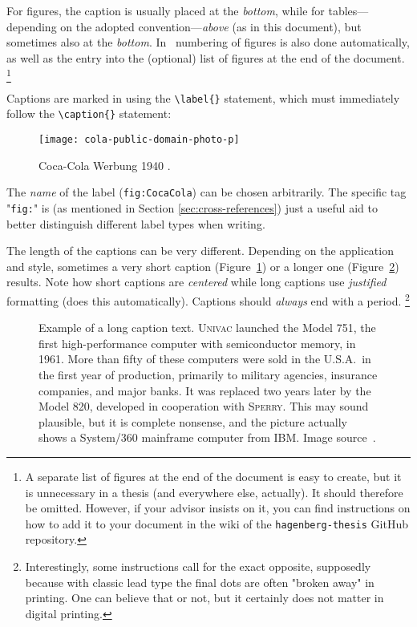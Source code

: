 For figures, the caption is usually placed at the \emph{bottom}, while for
tables---depending on the adopted convention---\emph{above} (as in this
document), but sometimes also at the \emph{bottom}. In \latex\ numbering of
figures is also done automatically, as well as the entry into the (optional)
list of figures at the end of the document.%
\footnote{A separate list of figures at the end of the document is easy to
create, but it is unnecessary in a thesis (and everywhere else, actually).
It should therefore be omitted. However, if your advisor insists on it, you can
find instructions on how to add it to your document in the wiki of the
\texttt{hagenberg-thesis} GitHub repository.}

Captions are marked in \latex using the \verb!\label{}! statement, which must
immediately follow the \verb!\caption{}! statement:
%
\begin{LaTeXCode}[numbers=none]
\begin{figure}
    \centering
    \texttt{[image: cola-public-domain-photo-p]}
    \caption{Coca-Cola Werbung 1940 \cite{CocaCola1940}.}
    \label{fig:CocaCola}
\end{figure}
\end{LaTeXCode}
%
The \emph{name} of the label (\texttt{fig:CocaCola}) can be chosen
arbitrarily. The specific tag "\texttt{fig:}" is (as mentioned in Section
\ref{sec:cross-references}) just a useful aid to better distinguish different
label types when writing.

The length of the captions can be very different. Depending on the
application and style, sometimes a very short caption
(Figure~\ref{fig:CocaCola}) or a longer one (Figure~\ref{fig:ibm360}) results.
Note how short captions are \emph{centered} while long captions use
\emph{justified} formatting (\latex does this automatically). Captions should
\emph{always} end with a period.%
\footnote{Interestingly, some instructions call for the exact opposite,
    supposedly because with classic lead type the final dots are often
    "broken away" in printing. One can believe that or not, but it certainly
    does not matter in digital printing.}

\begin{figure}
    \centering
    \caption{Example of a long caption text. \textsc{Univac} launched the
    Model 751, the first high-performance computer with semiconductor memory,
        in 1961. More than fifty of these computers were sold in the U.S.A.\
        in the first year of production, primarily to military agencies,
        insurance companies, and major banks. It was replaced two years later
        by the Model 820, developed in cooperation with \textsc{Sperry}. This
        may sound plausible, but it is complete nonsense, and the picture
        actually shows a System/360 mainframe computer from IBM. Image
        source~\cite{IBM360}.}
    \label{fig:ibm360}
\end{figure}


